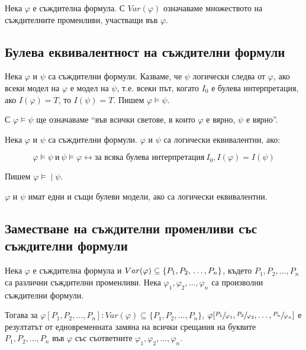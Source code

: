 \documentclass{article}
\newcommand{\mymod}{\models\!\mid}
\begin{document}
\begin{mydef}
Нека $\varphi$ е съждителна формула. С $Var(\varphi)$ означаваме множеството на съждителните променливи, участващи във $\varphi$.
\end{mydef}


\subsection*{Булева еквивалентност на съждителни формули}

\begin{mydef}
Нека $\varphi$ и $\psi$ са съждителни формули. Казваме, че $\psi$ логически следва от $\varphi$, ако всеки модел на $\varphi$ е модел на $\psi$, т.е. всеки път, когато $I_0$ е булева интерпретация, ако $I(\varphi) = T$, то $I(\psi) = T$. Пишем $\varphi \models \psi$.

\begin{remark}
С $\varphi \models \psi$ ще означаваме ``във всички светове, в които $\varphi$ е вярно, $\psi$ е вярно''.
\end{remark}

\end{mydef}

\begin{mydef}
Нека $\varphi$ и $\psi$ са съждителни формули. $\varphi$ и $\psi$ са логически еквивалентни, ако:

\[\varphi \models \psi\ \text{и}\ \psi \models \varphi \longleftrightarrow \text{за всяка булева интерпретация}\ I_0, I(\varphi) = I(\psi)\]

Пишем $\varphi \mymod \psi$.

\begin{remark}
$\varphi$ и $\psi$ имат едни и същи булеви модели, ако са логически еквивалентни.
\end{remark}
\end{mydef}

\subsection*{Заместване на съждителни променливи със съждителни формули}

\begin{mydef}
Нека $\varphi$ е съждителна формула и $Var(\varphi) \subseteq \{P_1, P_2,\\ \ldots, P_n\}$, където $P_1, P_2, \ldots, P_n$ са различни съждителни променливи. Нека $\varphi_1, \varphi_2, \ldots, \varphi_n$ са произволни съждителни формули.

Тогава за $\varphi[P_1, P_2, \ldots, P_n]: Var(\varphi) \subseteq \{P_1, P_2, \ldots, P_n\}$, $\varphi[\sfrac{P_1}{\varphi_1}, \sfrac{P_2}{\varphi_2}, \ldots, \sfrac{P_n}{\varphi_n}]$ е резултатът от едновременната замяна на всички срещания на буквите $P_1, P_2, \ldots, P_n$ във $\varphi$ със съответните $\varphi_1, \varphi_2, \ldots, \varphi_n$.
\end{mydef}
\end{document}
